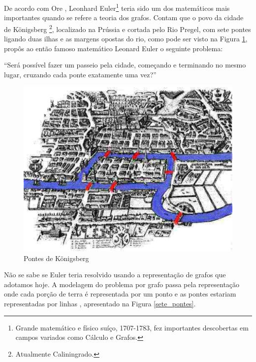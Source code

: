 De acordo com Ore \cite{Ore:1963}, Leonhard Euler\footnote{Grande matemático e físico suíço, 1707-1783, fez importantes descobertas em campos variados como Cálculo e Grafos.} teria sido um dos matemáticos mais importantes quando se refere a teoria dos grafos. Contam que o povo da cidade de Königsberg \footnote{Atualmente Caliningrado.}, localizado na Prússia e cortada pelo Rio Pregel, com sete pontes ligando duas ilhas e as margens opostas do rio, como pode ser visto na Figura \ref{Konigsberg}, propôs ao então famoso matemático Leonard Euler o seguinte problema:

	“Será possível fazer um passeio pela cidade, começando e
	terminando no mesmo lugar, cruzando cada ponte exatamente uma vez?”

\begin{figure}[!h]
	\centering
	\includegraphics[scale=0.35]{figuras/capitulo2/Konigsberg.eps}
	\caption{Pontes de Königsberg}
	\label{Konigsberg}
\end{figure}

Não se sabe se Euler teria resolvido usando a representação de grafos que adotamos hoje. A modelagem do problema por grafo passa pela representação onde cada porção de terra  é representada por um ponto e as pontes estariam representadas por linhas \cite{Ore:1963}, apresentado na Figura \ref{sete_pontes}.

